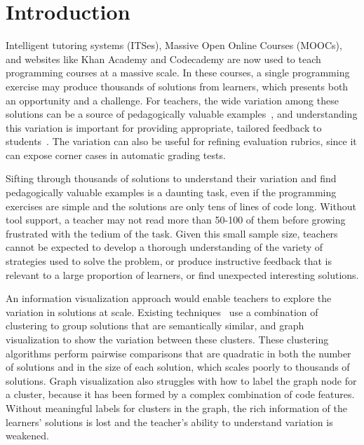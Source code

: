 \documentclass{sigchi}
\begin{document}
\section{Introduction}

Intelligent tutoring systems (ITSes), Massive Open Online Courses (MOOCs), and websites like Khan Academy and Codecademy are now used to teach programming courses at a massive scale. In these courses, a single programming exercise may produce thousands of solutions from learners, which presents both an opportunity and a challenge. For teachers, the wide variation among these solutions can be a source of pedagogically valuable examples~\cite{marton13}, and understanding this variation is important for providing appropriate, tailored feedback to students~\cite{basupowergrading,MOOCshop}. The variation can also be useful for refining evaluation rubrics, since it can expose corner cases in automatic grading tests.

Sifting through thousands of solutions to understand their variation and find pedagogically valuable examples is a daunting task, even if the programming exercises are simple and the solutions are only tens of lines of code long. Without tool support, a teacher may not read more than 50-100 of them before growing frustrated with the tedium of the task. Given this small sample size, teachers cannot be expected to develop a thorough understanding of the variety of strategies used to solve the problem, or produce instructive feedback that is relevant to a large proportion of learners, or find unexpected interesting solutions.

An information visualization approach would enable teachers to explore the variation in solutions at scale. Existing techniques~\cite{gradingsigcse14,MOOCshop,codewebs} use a combination of clustering to group solutions that are semantically similar, and graph visualization to show the variation between these clusters. These clustering algorithms perform pairwise comparisons that are quadratic in both the number of solutions and in the size of each solution, which scales poorly to thousands of solutions. Graph visualization also struggles with how to label the graph node for a cluster, because it has been formed by a complex combination of code features. Without meaningful labels for clusters in the graph, the rich information of the learners' solutions is lost and the teacher's ability to understand variation is weakened.
\end{document}
